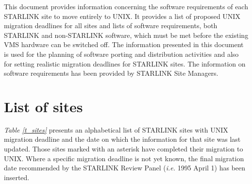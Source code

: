 \vspace{5mm}

This document provides information concerning the software requirements 
of each STARLINK site to move entirely to UNIX.
It provides a list of proposed UNIX migration deadlines for all sites and 
lists of software requirements, both STARLINK and non-STARLINK software, 
which must be met before the existing VMS hardware can be switched off.
The information presented in this document is used for the planning 
of software porting and distribution activities and also for setting 
realistic migration deadlines for STARLINK sites.
The information on software requirements has been provided by STARLINK Site
Managers.


\newpage

\setlength{\parskip}{0mm}
\tableofcontents
\setlength{\parskip}{\medskipamount}

\newpage
\listoftables
\setlength{\parskip}{\medskipamount}
\markright{\stardocname}

\sloppypar
\newpage
\section{List of sites}

{\em Table \ref{t_sites}} presents an alphabetical list of STARLINK sites with
UNIX migration deadline and the date on which the information for that site 
was last updated.
Those sites marked with an asterisk have completed their migration to UNIX.
Where a specific migration deadline is not yet known, the final migration date
recommended by the STARLINK Review Panel ({\em i.e.} 1995 April 1) has been
inserted.

